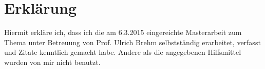 \newpage
\section*{Erklärung}
\makeatletter
Hiermit erkläre ich, dass ich die am 6.3.2015 eingereichte Masterarbeit zum Thema
\emph{\@title} unter Betreuung von Prof. Ulrich Brehm selbstständig erarbeitet, 
verfasst und Zitate kenntlich gemacht habe. Andere als die angegebenen Hilfsmittel 
wurden von mir nicht benutzt.
\makeatother
